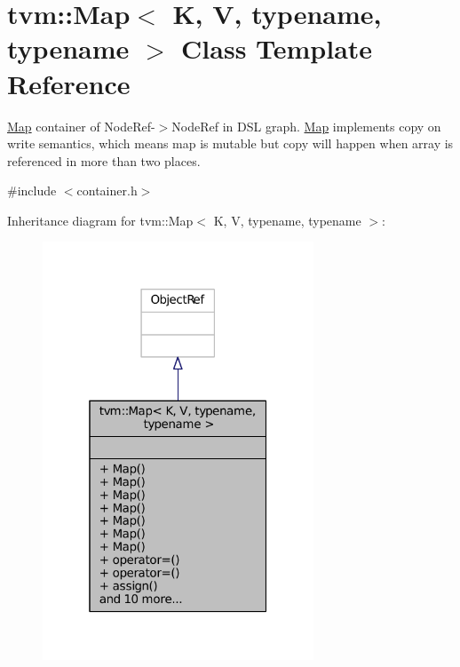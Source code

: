 \hypertarget{classtvm_1_1Map}{}\section{tvm\+:\+:Map$<$ K, V, typename, typename $>$ Class Template Reference}
\label{classtvm_1_1Map}


\hyperlink{classtvm_1_1Map}{Map} container of Node\+Ref-\/$>$Node\+Ref in D\+SL graph. \hyperlink{classtvm_1_1Map}{Map} implements copy on write semantics, which means map is mutable but copy will happen when array is referenced in more than two places.  




{\ttfamily \#include $<$container.\+h$>$}



Inheritance diagram for tvm\+:\+:Map$<$ K, V, typename, typename $>$\+:
\nopagebreak
\begin{figure}[H]
\begin{center}
\leavevmode
\includegraphics[width=229pt]{classtvm_1_1Map__inherit__graph}
\end{center}
\end{figure}


